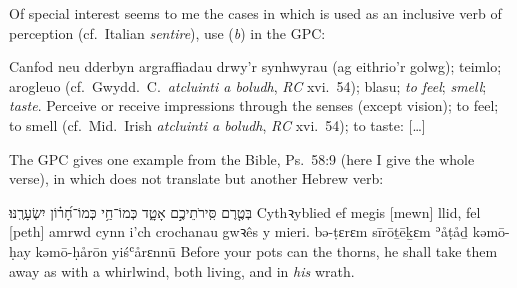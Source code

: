 \begin{enumerate}[A.]
		Of special interest seems to me the cases in which  is used as an inclusive verb of perception (cf.\ Italian \textit{sentire}), use (\textit{b}) in the GPC:
		\begin{changemargin}{1cm}{0cm}
			\begin{bilingquote}
				\transline
				{{Canfod neu dderbyn argraffiadau drwy’r synhwyrau (ag eithrio’r golwg); teimlo; arogleuo (cf.\ Gwydd.~C.\ \textit{atcluinti a boludh}, \textit{RC} xvi.~54); blasu; \textit{to feel}; \textit{smell}; \textit{taste}.}}
				{Perceive or receive impressions through the senses (except vision); to feel; to smell (cf.\ Mid.~Irish \textit{atcluinti a boludh}, \textit{RC} xvi.~54); to taste: […]}
			\end{bilingquote}
		\end{changemargin}
		\vspace{-0.5cm}
		The GPC gives one example from the Bible, Ps.~58:9 (here I give the whole verse), in which  does not translate {\shama} but another Hebrew verb:
		\begin{changemargin}{1cm}{0cm}
			\begin{bilingquote}
				\quoling
				{בְּטֶ֤רֶם  סִּֽירֹתֵיכֶ֣ם אָטָ֑ד כְּמוֹ־חַ֥י כְּמוֹ־חָ֝ר֗וֹן יִשְׂעָרֶֽנּוּ׃}
				{Cythꝛyblied ef megis [mewn] llid, fel [peth] amrwd cynn i’ch crochanau  gwꝛês y mieri.}
				{bə-ṭɛrɛm  sīrōṯēḵɛm ʾåṭåḏ kəmō-ḥay kəmō-ḥårōn yiśʿårɛnnū}
				{Before your pots can  the thorns, he shall take them away as with a whirlwind, both living, and in \textit{his} wrath.}
			\end{bilingquote}
		\end{changemargin}
		\vspace{-0.5cm}
\end{enumerate}
